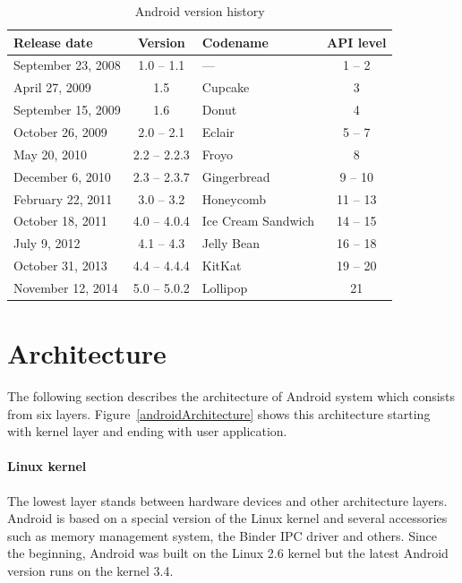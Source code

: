 \begin {table}[h!]
    \begin{tabular}{|l|c|l|c|}
    \hline
    {\bf Release date}  & {\bf Version} & {\bf Codename}        & {\bf API level}   \\
    \hline \hline
    September 23, 2008  & 1.0 -- 1.1    & ---                   & 1 -- 2            \\
    \hline
    April 27, 2009      & 1.5           & Cupcake               & 3                 \\
    \hline
    September 15, 2009  & 1.6           & Donut                 & 4                 \\
    \hline
    October 26, 2009    & 2.0 -- 2.1    & Eclair                & 5 -- 7            \\
    \hline
    May 20, 2010        & 2.2 -- 2.2.3  & Froyo                 & 8                 \\
    \hline
    December 6, 2010    & 2.3 -- 2.3.7  & Gingerbread           & 9 -- 10           \\
    \hline
    February 22, 2011   & 3.0 -- 3.2    & Honeycomb             & 11 -- 13          \\
    \hline
    October 18, 2011    & 4.0 -- 4.0.4  & Ice Cream Sandwich    & 14 -- 15          \\
    \hline
    July 9, 2012        & 4.1 -- 4.3    & Jelly Bean            & 16 -- 18          \\
    \hline
    October 31, 2013    & 4.4 -- 4.4.4  & KitKat                & 19 -- 20          \\
    \hline
    November 12, 2014   & 5.0 -- 5.0.2  & Lollipop              & 21                \\
    \hline
    \end{tabular}
    \centering
    \caption{Android version history}
    \label{androidHistory}
\end{table}

\section{Architecture}\label{AndroidArchitecture}
The following section describes the architecture of Android system \cite{AndroidDevBook} which consists from six layers. Figure~\ref{androidArchitecture} shows this architecture starting with kernel layer and ending with user application.

\paragraph{Linux kernel}
The lowest layer stands between hardware devices and other architecture layers. Android is based on a special version of the Linux kernel and several accessories such as memory management system, the Binder IPC driver and others. Since the beginning, Android was built on the Linux 2.6 kernel but the latest Android version runs on the kernel 3.4.

